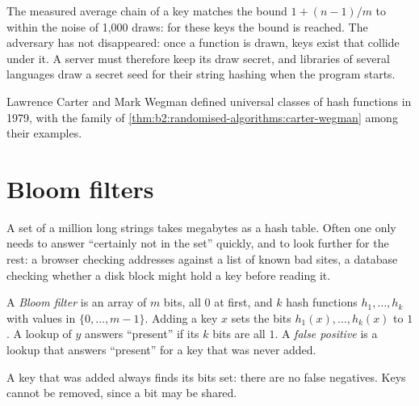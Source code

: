 The measured average chain of a key matches the bound $1 + (n - 1)/m$ to within the noise of 1,000 draws: for these
keys the bound is reached. The adversary has not disappeared: once a function is drawn, keys exist that collide under
it. A server must therefore keep its draw secret, and libraries of several languages draw a secret seed for their
string hashing when the program starts.

\begin{history}
Lawrence Carter and Mark Wegman defined universal classes of hash functions in 1979, with the family of
\cref{thm:b2:randomised-algorithms:carter-wegman} among their examples.
\end{history}

\section{Bloom filters}\label{sec:b2:randomised-algorithms:bloom}

A set of a million long strings takes megabytes as a hash table. Often one only needs to answer ``certainly not in the
set'' quickly, and to look further for the rest: a browser checking addresses against a list of known bad sites, a
database checking whether a disk block might hold a key before reading it.

\begin{definition}\label{def:b2:randomised-algorithms:bloom}
A \emph{Bloom filter} is an array of $m$ bits, all $0$ at first, and $k$ hash functions $h_1, \dots,
h_k$ with values in $\{0, \dots, m - 1\}$. Adding a key $x$ sets the bits $h_1(x), \dots, h_k(x)$ to $1$. A lookup of
$y$ answers ``present'' if its $k$ bits are all $1$. A \emph{false positive} is a
lookup that answers ``present'' for a key that was never added.
\end{definition}

A key that was added always finds its bits set: there are no false negatives. Keys cannot be removed, since a bit may be
shared.

\label{lst:b2:randomised-algorithms:bloom}

\label{out:b2:randomised-algorithms:bloom-small}

